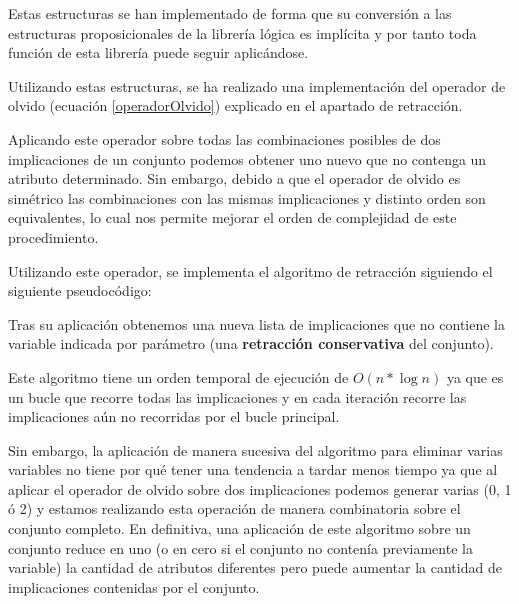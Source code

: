 	Estas estructuras se han implementado de forma que su conversión a las estructuras proposicionales de la librería lógica es implícita y por tanto toda función de esta librería puede seguir aplicándose.
	
	Utilizando estas estructuras, se ha realizado una implementación del operador de olvido (ecuación \ref{operadorOlvido}) explicado en el apartado de retracción.
	
	Aplicando este operador sobre todas las combinaciones posibles de dos implicaciones de un conjunto podemos obtener uno nuevo que no contenga un atributo determinado. Sin embargo, debido a que el operador de olvido es simétrico las combinaciones con las mismas implicaciones y distinto orden son equivalentes, lo cual nos permite mejorar el orden de complejidad de este procedimiento.
	
	Utilizando este operador, se implementa el algoritmo de retracción siguiendo el siguiente pseudocódigo: 
	
	{
		\centering
		\noindent{}	

	}
	
	Tras su aplicación obtenemos una nueva lista de implicaciones que no contiene la variable indicada por parámetro (una \textbf{retracción conservativa} del conjunto).
	
	Este algoritmo tiene un orden temporal de ejecución de $O(n*\log{n})$ ya que es un bucle que recorre todas las implicaciones y en cada iteración recorre las implicaciones aún no recorridas por el bucle principal. 
	
	Sin embargo, la aplicación de manera sucesiva del algoritmo para eliminar varias variables no tiene por qué tener una tendencia a tardar menos tiempo ya que al aplicar el operador de olvido sobre dos implicaciones podemos generar varias (0, 1 ó 2) y estamos realizando esta operación de manera combinatoria sobre el conjunto completo. En definitiva, una aplicación de este algoritmo sobre un conjunto reduce en uno (o en cero si el conjunto no contenía previamente la variable) la cantidad de atributos diferentes pero puede aumentar la cantidad de implicaciones contenidas por el conjunto. 
	


